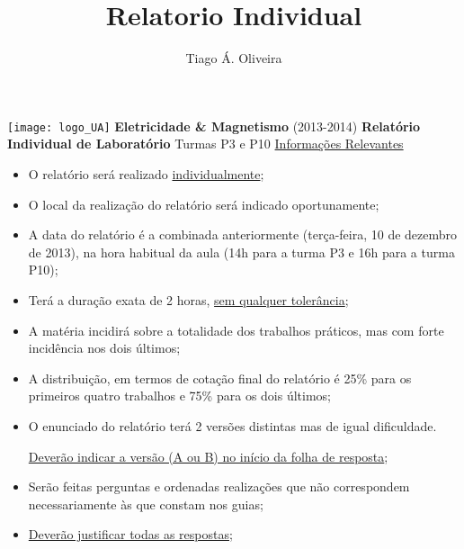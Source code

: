 \documentclass[11pt,a4paper,final]{article}
\author{Tiago Á. Oliveira}
\title{Relatorio Individual}
\begin{document}
\thispagestyle{empty}
\begin{center}
\texttt{[image: logo\_UA]}
\linebreak\linebreak
\LARGE\textbf{Eletricidade \& Magnetismo}
\normalsize\linebreak
(2013-2014)
\linebreak\linebreak
\textbf{Relat\'{o}rio Individual de Laborat\'{o}rio}
\linebreak
Turmas P3 e P10
\linebreak\linebreak
\underline{Informa\c{c}\~{o}es Relevantes}
\end{center}

\begin{itemize}
\item O relat\'{o}rio ser\'{a} realizado \underline{individualmente};

\item O local da realiza\c{c}\~{a}o do relat\'{o}rio ser\'{a} indicado oportunamente;

\item A data do relat\'{o}rio \'{e} a combinada anteriormente (ter\c{c}a-feira, 10 de dezembro de 2013), na hora habitual da aula (14h para a turma P3 e 16h para a turma P10);

\item Ter\'{a} a dura\c{c}\~{a}o exata de 2 horas, \underline{sem qualquer toler\^{a}ncia};

\item A mat\'{e}ria incidir\'{a} sobre a totalidade dos trabalhos pr\'{a}ticos, mas com forte incid\^{e}ncia nos dois \'{u}ltimos;

\item A distribui\c{c}\~{a}o, em termos de cota\c{c}\~{a}o final do relat\'{o}rio é 25\% para os primeiros quatro trabalhos e 75\% para os dois \'{u}ltimos;

\item O enunciado do relat\'{o}rio ter\'{a} 2 vers\~{o}es distintas mas de igual dificuldade. 

\underline{Dever\~{a}o indicar a vers\~{a}o (A ou B) no in\'{i}cio da folha de resposta};

\item Ser\~{a}o feitas perguntas e ordenadas realiza\c{c}\~{o}es que n\~{a}o correspondem necessariamente \`{a}s que constam nos guias;

\item \underline{Dever\~{a}o justificar todas as respostas};


\end{itemize}
\end{document}
